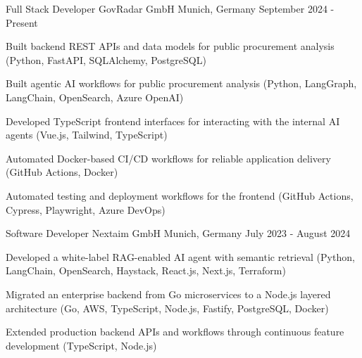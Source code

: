 


\begin{cventries}


\cventry
{Full Stack Developer} %
{GovRadar GmbH} %
{Munich, Germany} %
{September 2024 - Present} %
{ %
\begin{cvitems}
\item {Built backend REST APIs and data models for public procurement analysis (Python, FastAPI, SQLAlchemy, PostgreSQL)}
\item {Built agentic AI workflows for public procurement analysis (Python, LangGraph, LangChain, OpenSearch, Azure OpenAI)}
\item {Developed TypeScript frontend interfaces for interacting with the internal AI agents (Vue.js, Tailwind, TypeScript)}
\item {Automated Docker-based CI/CD workflows for reliable application delivery (GitHub Actions, Docker)}
\item {Automated testing and deployment workflows for the frontend (GitHub Actions, Cypress, Playwright, Azure DevOps)}
\end{cvitems}
}


\cventry
{Software Developer} %
{Nextaim GmbH} %
{Munich, Germany} %
{July 2023 - August 2024} %
{ %
\begin{cvitems}
\item {Developed a white-label RAG-enabled AI agent with semantic retrieval (Python, LangChain, OpenSearch, Haystack, React.js, Next.js, Terraform)}
\item {Migrated an enterprise backend from Go microservices to a Node.js layered architecture (Go, AWS, TypeScript, Node.js, Fastify, PostgreSQL, Docker)}
\item {Extended production backend APIs and workflows through continuous feature development (TypeScript, Node.js)}
\end{cvitems}
}


\end{cventries}
